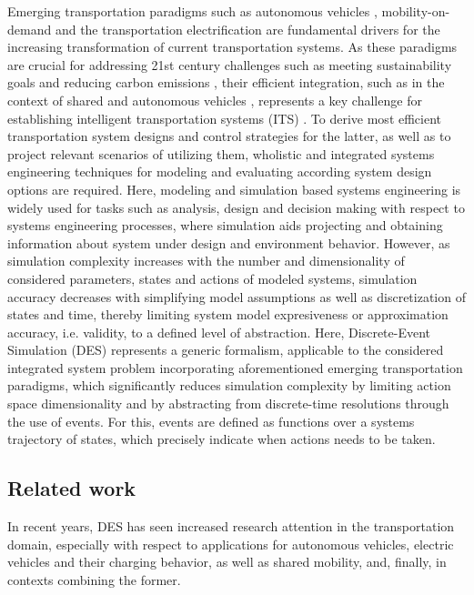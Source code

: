 \documentclass[graybox]{svmult}
\begin{document}
Emerging transportation paradigms such as autonomous vehicles \cite{hancock2019future}, mobility-on-demand \cite{atasoy2015concept} and the transportation electrification \cite{pereirinha2018main} are fundamental drivers for the increasing transformation of current transportation systems. As these paradigms are crucial for addressing 21st century challenges such as meeting sustainability goals and reducing carbon emissions \cite{sachs2019six}, their efficient integration, such as in the context of shared and autonomous vehicles \cite{narayanan2020shared}, represents a key challenge for establishing intelligent transportation systems (ITS) \cite{figueiredo2001towards}. To derive most efficient transportation system designs and control strategies for the latter, as well as to project relevant scenarios of utilizing them, wholistic and integrated systems engineering techniques for modeling and evaluating according system design options are required.
Here, modeling and simulation based systems engineering \cite{gianni2014modeling} is widely used for tasks such as analysis, design and decision making with respect to systems engineering processes, where simulation aids projecting and obtaining information about system under design and environment behavior.
However, as simulation complexity increases with the number and dimensionality of considered parameters, states and actions of modeled systems, simulation accuracy decreases with simplifying model assumptions as well as discretization of states and time, thereby limiting system model expresiveness or approximation accuracy, i.e. validity, to a defined level of abstraction.
Here, Discrete-Event Simulation (DES) \cite{fishman2001discrete} represents a generic formalism, applicable to the considered integrated system problem incorporating aforementioned emerging transportation paradigms, which significantly reduces simulation complexity by limiting action space dimensionality and by abstracting from discrete-time resolutions through the use of events. For this, events are defined as functions over a systems trajectory of states, which precisely indicate when actions needs to be taken. 

\subsection{Related work}
In recent years, DES has seen increased research attention in the transportation domain, especially with respect to applications for autonomous vehicles, electric vehicles and their charging behavior, as well as shared mobility, and, finally, in contexts combining the former.
\end{document}
